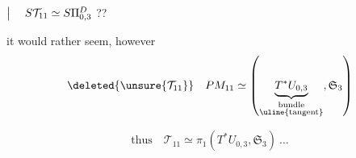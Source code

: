 
 \quad
$\bigm|\quad S\mathcal T_{11}\simeq S\Pi_{0,3}^{D}$ ??

it would rather seem, however
\[
\deleted{\unsure{\mathcal T_{11}}}\quad
PM_{11}\simeq
\left(\underbrace{T^*U_{0,3}}_{\substack{\text{bundle}\\\text{\uline{tangent}}}},\mathfrak S_3\right)
\]

\[
\text{thus}\quad \mathcal T_{11}\simeq\pi_1(T^*U_{0,3},\mathfrak S_3)\ \ldots
\]

